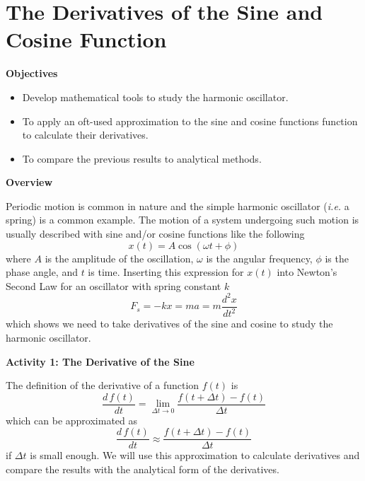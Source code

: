 \section{The Derivatives of the Sine and Cosine Function}


\makelabheader %

\bigskip
\textbf{Objectives }

\begin{itemize}[nosep]
\item Develop mathematical tools to study the harmonic oscillator.
\item To apply an oft-used approximation to the sine and cosine functions function to calculate their derivatives.
\item To compare the previous results to analytical methods.
\end{itemize}

\medskip
\textbf{Overview }

Periodic motion is common in nature and the simple harmonic oscillator ({\it i.e.} a spring) is
a common example.
The motion of a system undergoing such motion is usually described with sine
and/or cosine functions like the following
\begin{equation}
x(t) = A\cos(\omega t + \phi)
\end{equation}
where $A$ is the amplitude of the oscillation, $\omega$ is the angular frequency, $\phi$ is the
phase angle, and $t$ is time.
Inserting this expression for $x(t)$ into Newton's Second Law for an oscillator
with spring constant $k$
\begin{equation}
F_s = -kx = ma = m\frac{d^2x}{dt^2}
\end{equation}
which shows we need to take derivatives of the sine and cosine to study the harmonic oscillator.

\textbf{Activity 1: The Derivative of the Sine} 

The definition of the derivative of a function $f(t)$ is 
\begin{equation}
\frac{d \, f \! (t)}{dt} = \lim_{\Delta t \rightarrow 0} \frac{f(t+\Delta t) - f(t)}{\Delta t}
\end{equation}
which can be approximated as
\begin{equation}
\frac{d \, f \! (t)}{dt} \approx \frac{f(t+\Delta t) - f(t)}{\Delta t}
\label{eq:approx}
\end{equation}
if $\Delta t$ is small enough.
We will use this approximation to calculate derivatives and compare the results
with the analytical form of the derivatives.

